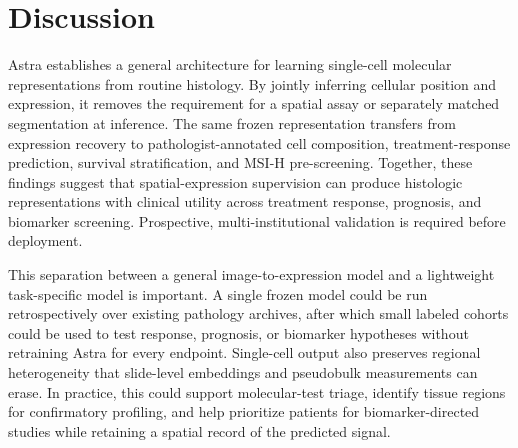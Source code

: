 \documentclass[11pt]{article}
\begin{document}
\section{Discussion}

Astra establishes a general architecture for learning single-cell molecular
representations from routine histology. By jointly inferring cellular position
and expression, it removes the requirement for a spatial assay or separately
matched segmentation at inference. The same frozen representation transfers
from expression recovery to pathologist-annotated cell composition,
treatment-response prediction, survival stratification, and MSI-H pre-screening.
Together, these findings suggest that
spatial-expression supervision can produce histologic representations with
clinical utility across treatment response, prognosis, and biomarker screening.
Prospective, multi-institutional validation is required before deployment.

This separation between a general image-to-expression model and a lightweight
task-specific model is important. A single frozen model could be run
retrospectively over existing pathology archives, after which small labeled
cohorts could be used to test response, prognosis, or biomarker hypotheses
without retraining Astra for every endpoint. Single-cell output also
preserves regional heterogeneity that slide-level embeddings and pseudobulk
measurements can erase. In practice, this could support molecular-test triage,
identify tissue regions for confirmatory profiling, and help prioritize patients
for biomarker-directed studies while retaining a spatial record of the predicted
signal.
\end{document}
